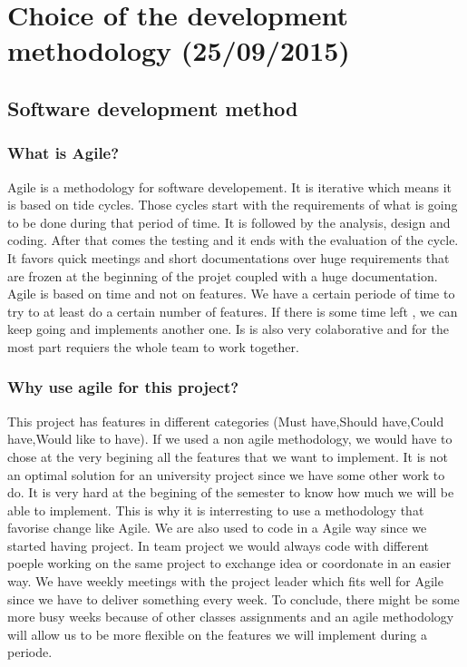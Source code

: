 \section{Choice of the development methodology (25/09/2015)}

\subsection{Software development method}
\subsubsection{What is Agile?}

Agile is a methodology for software developement. It is iterative which means it is based on tide cycles. Those cycles start with the requirements of what is going to be done during that period of time.
It is followed by the analysis, design and coding. After that comes the testing and it ends with the evaluation of the cycle.
It favors quick meetings and short documentations over huge requirements that are frozen at the beginning of the projet coupled with a huge documentation.
Agile is based on time and not on features. We have a certain periode of time to try to at least do a certain number of features. If there is some time left , we can keep going and implements another one.
Is is also very colaborative and for the most part requiers the whole team to work together.

\subsubsection{Why use agile for this project?}

This project has features in different categories (Must have,Should have,Could have,Would like to have). If we used a non agile methodology, we would have to chose at the very begining all the features that we want to implement.
It is not an optimal solution for an university project since we have some other work to do. It is very hard at the begining of the semester to know how much we will be able to implement. This is why it is interresting to use a methodology that favorise change like Agile.
We are also used to code in a Agile way since we started having project. In team project we would always code with different poeple working on the same project to exchange idea or coordonate in an easier way.
We have weekly meetings with the project leader which fits well for Agile since we have to deliver something every week.
To conclude, there might be some more busy weeks because of other classes assignments and an agile methodology will allow us to be more flexible on the features we will implement during a periode.

